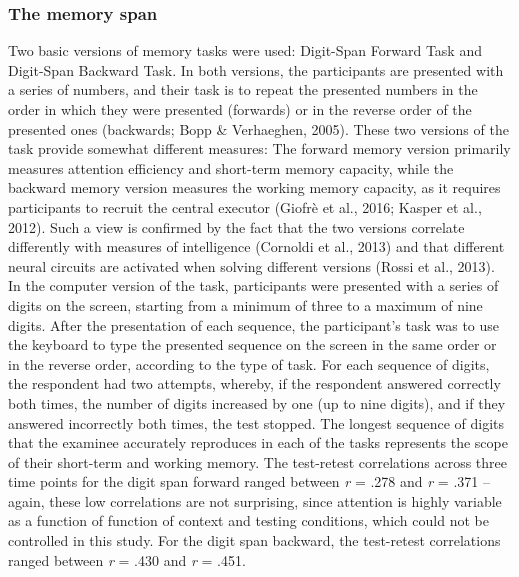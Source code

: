 \documentclass[authordate, empirical]{jote-new-article}
\begin{document}
\subsubsection{The memory span}
Two basic versions of memory tasks were used: Digit-Span Forward Task and Digit-Span Backward Task. In both versions, the participants are presented with a series of numbers, and their task is to repeat the presented numbers in the order in which they were presented (forwards) or in the reverse order of the presented ones (backwards; Bopp \& Verhaeghen, 2005). These two versions of the task provide somewhat different measures: The forward memory version primarily measures attention efficiency and short-term memory capacity, while the backward memory version measures the working memory capacity, as it requires participants to recruit the central executor (Giofrè et al., 2016; Kasper et al., 2012). Such a view is confirmed by the fact that the two versions correlate differently with measures of intelligence (Cornoldi et al., 2013) and that different neural circuits are activated when solving different versions (Rossi et al., 2013). In the computer version of the task, participants were presented with a series of digits on the screen, starting from a minimum of three to a maximum of nine digits. After the presentation of each sequence, the participant's task was to use the keyboard to type the presented sequence on the screen in the same order or in the reverse order, according to the type of task. For each sequence of digits, the respondent had two attempts, whereby, if the respondent answered correctly both times, the number of digits increased by one (up to nine digits), and if they answered incorrectly both times, the test stopped. The longest sequence of digits that the examinee accurately reproduces in each of the tasks represents the scope of their short-term and working memory. The test-retest correlations across three time points for the digit span forward ranged between\emph{ r} = .278 and \emph{r} = .371 -- again, these low correlations are not surprising, since attention is highly variable as a function of function of context and testing conditions, which could not be controlled in this study. For the digit span backward, the test-retest correlations ranged between \emph{r} = .430 and \emph{r} = .451.
\end{document}
